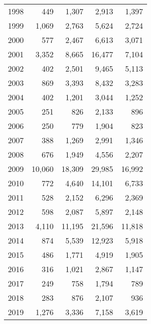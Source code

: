 \documentclass[11pt]{book}
\begin{document}
\begin{longtable}[]{@{}lrrrr@{}}
1998 & 449 & 1,307 & 2,913 & 1,397\tabularnewline
1999 & 1,069 & 2,763 & 5,624 & 2,724\tabularnewline
2000 & 577 & 2,467 & 6,613 & 3,071\tabularnewline
2001 & 3,352 & 8,665 & 16,477 & 7,104\tabularnewline
2002 & 402 & 2,501 & 9,465 & 5,113\tabularnewline
2003 & 869 & 3,393 & 8,432 & 3,283\tabularnewline
2004 & 402 & 1,201 & 3,044 & 1,252\tabularnewline
2005 & 251 & 826 & 2,133 & 896\tabularnewline
2006 & 250 & 779 & 1,904 & 823\tabularnewline
2007 & 388 & 1,269 & 2,991 & 1,346\tabularnewline
2008 & 676 & 1,949 & 4,556 & 2,207\tabularnewline
2009 & 10,060 & 18,309 & 29,985 & 16,992\tabularnewline
2010 & 772 & 4,640 & 14,101 & 6,733\tabularnewline
2011 & 528 & 2,152 & 6,296 & 2,369\tabularnewline
2012 & 598 & 2,087 & 5,897 & 2,148\tabularnewline
2013 & 4,110 & 11,195 & 21,596 & 11,818\tabularnewline
2014 & 874 & 5,539 & 12,923 & 5,918\tabularnewline
2015 & 486 & 1,771 & 4,919 & 1,905\tabularnewline
2016 & 316 & 1,021 & 2,867 & 1,147\tabularnewline
2017 & 249 & 758 & 1,794 & 789\tabularnewline
2018 & 283 & 876 & 2,107 & 936\tabularnewline
2019 & 1,276 & 3,336 & 7,158 & 3,619\tabularnewline
\bottomrule
\end{longtable}
\clearpage
\end{document}
